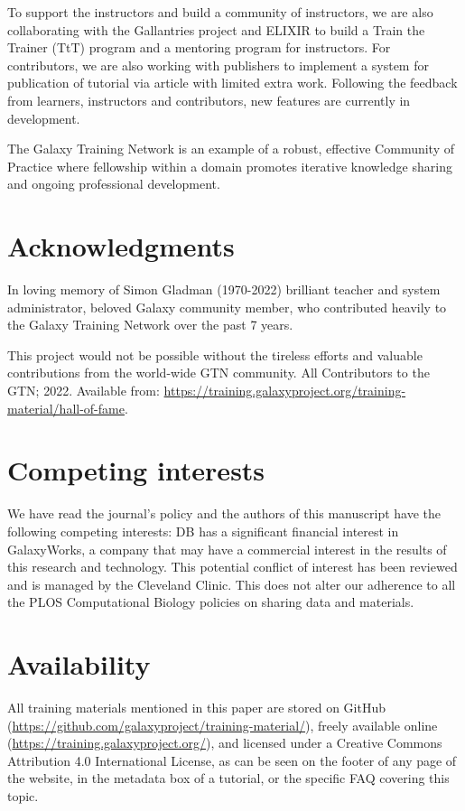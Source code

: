To support the instructors and build a community of instructors, we are also collaborating with the Gallantries project and ELIXIR to build a Train the Trainer (TtT) \cite{Morgan2017, Via2017,McGrath2019} program and a mentoring program for instructors. For contributors, we are also working with publishers to implement a system for publication of  tutorial via article with limited extra work. Following the feedback from learners, instructors and contributors, new features are currently in development. 

The Galaxy Training Network is an example of a robust, effective Community of Practice \cite{Li_2009} where fellowship within a domain promotes iterative knowledge sharing and ongoing professional development. 


\section*{Acknowledgments}

In loving memory of Simon Gladman (1970-2022) brilliant teacher and system administrator, beloved Galaxy community member, who contributed heavily to the Galaxy Training Network over the past 7 years.

This project would not be possible without the tireless efforts and valuable contributions from the world-wide GTN community. All Contributors to the GTN; 2022. Available from: 
\url{https://training.galaxyproject.org/training-material/hall-of-fame}.


\section*{Competing interests}

We have read the journal's policy and the authors of this manuscript have the following competing interests: DB has a significant financial interest in GalaxyWorks, a company that may have a commercial interest in the results of this research and technology. This potential conflict of interest has been reviewed and is managed by the Cleveland Clinic. This does not alter our adherence to all the PLOS Computational Biology policies on sharing data and materials.

\section*{Availability}

All training materials mentioned in this paper are stored on GitHub (\url{https://github.com/galaxyproject/training-material/}), freely available online (\url{https://training.galaxyproject.org/}), and licensed under a Creative Commons Attribution 4.0 International License, as can be seen on the footer of any page of the website, in the metadata box of a tutorial, or the specific FAQ covering this topic.

